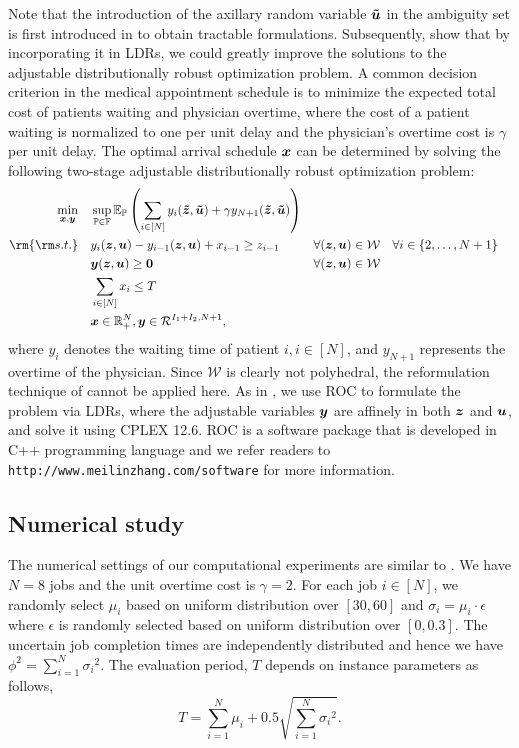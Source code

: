 \documentclass[fleqn,isre,blindrev]{informs4}
\newcommand{\mb}[1]{\mbox{\boldmath \ensuremath{#1}}}
\newcommand{\mbt}[1]{\mb{\tilde{#1}}}
\begin{document}
		Note that the introduction of the axillary random variable $\mbt{u}$ in the ambiguity set is first introduced in \cite{wks14} to obtain tractable formulations. Subsequently, \cite{bsz17} show that by incorporating it in LDRs, we could greatly improve the solutions to the adjustable distributionally robust optimization  problem. 
		A common decision criterion in the medical appointment schedule is to minimize the expected total cost of patients waiting and physician overtime, where the cost of a patient waiting is normalized to one per unit delay and the physician's overtime cost is $\gamma$ per unit delay. The optimal arrival schedule $\mb{x}$ can be determined by solving the following two-stage adjustable distributionally robust optimization problem:
\begin{equation}\label{mol:ApptScheduleELDRS}
			\begin{aligned}
				\min_{\boldsymbol{x}, \boldsymbol{y}} \quad & \sup_{\mathbb{P}\in \mathbb{F}}\mathbb{E}_\mathbb{P} \left(\sum_{i \in [N]}y_i(\mbt{z}, \mbt{u}) + \gamma y_{N+1}(\mbt{z}, \mbt{u})\right)  \\
				{\rm {\rm s.t.}}  \quad  & y_i(\mb{z}, \mb{u}) - y_{i-1}(\mb{z}, \mb{u}) + x_{i-1} \geq  {z}_{i-1} & \forall (\mb{z}, \mb{u})\in \mathcal{W} & \quad \forall i \in \{2,\dots ,N+1\} \\
				& \mb{y}(\mb{z}, \mb{u}) \geq \mb{0} &  \forall (\mb{z}, \mb{u})\in \mathcal{W}\\
				& \sum_{i \in [N]} x_i \leq T  \\
				& \mb{x} \in  \mathbb{R}^{N}_+, \mb{y} \in \mathcal{R}^{I_1+I_2, N+1},
			\end{aligned}
\end{equation}
		where $y_i$ denotes the waiting time of patient $i, i \in [N]$, and $y_{N+1}$ represents the overtime of the physician. Since $\mathcal{W}$ is clearly not polyhedral, the reformulation technique of \cite{bd16} cannot be applied here. As in \cite{bsz17}, we use ROC to formulate the problem via LDRs, where the adjustable variables $\mb{y}$ are affinely in both $\mb{z}$ and $\mb{u}$, and solve it using CPLEX 12.6. ROC is a software package that is developed in C++ programming language and we refer readers to \texttt{http://www.meilinzhang.com/software}  for more information.
		
		\subsection*{Numerical study}
		The numerical settings of our computational experiments are similar to \cite{bsz17}.
		We have $N=8$ jobs and the unit overtime cost is  $\gamma=2$.
		For each job $i\in[N]$, we  randomly select $\mu_{i}$ based on uniform distribution over $[30,60]$
		and $\sigma_i = \mu_i \cdot \epsilon$ where $\epsilon$ is randomly selected based on uniform distribution over $[0, 0.3]$.
		The uncertain job completion times are independently distributed and hence we have $ \phi^2 = \sum_{i=1}^{N} {\sigma_i}^2$.
		The evaluation period, $T$  depends on instance parameters as follows,
\begin{equation*}
		T = \sum_{i=1}^{N} \mu_i + 0.5 \sqrt{\sum_{i=1}^{N} {\sigma_i}^2}.
\end{equation*}
		
\end{document}
